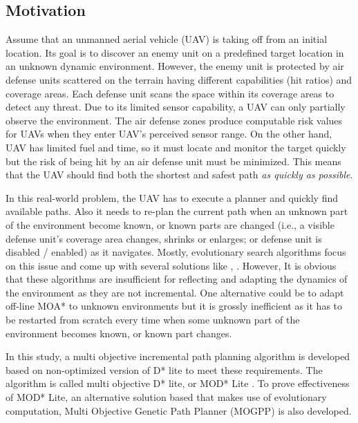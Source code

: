 \documentclass[10pt,journal]{IEEEtran}
\begin{document}
\subsection{Motivation}
Assume that an unmanned aerial vehicle (UAV) is taking off from an initial location. Its goal is to discover an enemy unit on a predefined target location in an unknown dynamic environment. However, the enemy unit is protected by air defense units scattered on the terrain having different capabilities (hit ratios) and coverage areas. Each defense unit scans the space within its coverage areas to detect any threat. Due to its limited sensor capability, a UAV can only partially observe the environment. The air defense zones produce computable risk values for UAVs when they enter UAV's perceived sensor range. On the other hand, UAV has limited fuel and time, so it must locate and monitor the target quickly but the risk of being hit by an air defense unit must be minimized. This means that the UAV should find both the shortest and safest path \textit{as quickly as possible}.

In this real-world problem, the UAV has to execute a planner and quickly find available paths. Also it needs to re-plan the current  path when an unknown part of the environment become known, or known parts are changed (i.e., a visible defense unit's coverage area changes, shrinks or enlarges; or defense unit is disabled / enabled) as it navigates. Mostly, evolutionary search algorithms focus on this issue and come up with several solutions like \cite{Peng_Xu_Zhang:2011}, \cite{Foo_Knutzon:2009}. However, It is obvious that these algorithms are insufficient for reflecting and adapting the dynamics of the environment as they are not incremental. One alternative could be to adapt off-line MOA* to unknown environments but it is grossly inefficient as it has to be restarted from scratch every time when some unknown part of the environment becomes known, or known part changes.

In this study, a multi objective incremental path planning algorithm is developed based on non-optimized version of D* lite \cite{Koenig:2002} to meet these requirements. The algorithm is called multi objective D* lite, or MOD* Lite \cite{Oral:2012}. To prove effectiveness of MOD* Lite,  an alternative solution based that makes use of evolutionary computation, Multi Objective Genetic Path Planner (MOGPP) is also developed. 
\end{document}
